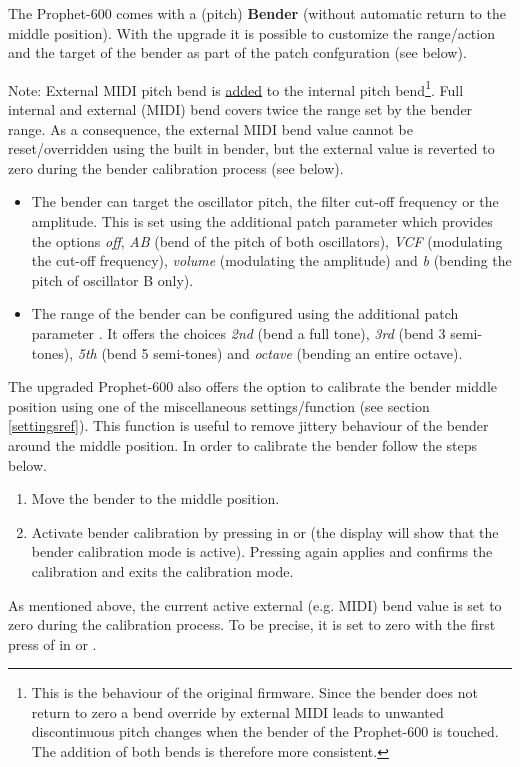 The Prophet-600 comes with a (pitch) \textbf{Bender} (without automatic return to the middle position). With the upgrade it is possible to customize the range/action and the target of the bender as part of the patch confguration (see below). 

Note: External MIDI pitch bend is \underline{added} to the internal pitch bend\footnote{This is the behaviour of the original firmware. Since the bender does not return to zero a bend override by external MIDI leads to unwanted discontinuous pitch changes when the bender of the Prophet-600 is touched. The addition of both bends is therefore more consistent.}. Full internal and external (MIDI) bend covers twice the range set by the bender range. As a consequence, the external MIDI bend value cannot be reset/overridden using the built in bender, but the external value is reverted to zero during the bender calibration process (see below).

\begin{itemize}
  \item The bender can target the oscillator pitch, the filter cut-off frequency or the amplitude. This is set using the additional patch parameter \bentarget which provides the options \textit{off}, \textit{AB} (bend of the pitch of both oscillators), \textit{VCF} (modulating the cut-off frequency), \textit{volume} (modulating the amplitude) and \textit{b} (bending the pitch of oscillator B only).
  \item The range of the bender can be configured using the additional patch parameter \bendrange. It offers the choices \textit{2nd} (bend a full tone), \textit{3rd} (bend 3 semi-tones), \textit{5th} (bend 5 semi-tones) and \textit{octave} (bending an entire octave).
\end{itemize}

The upgraded Prophet-600 also offers the option to calibrate the bender middle position using one of the miscellaneous settings/function (see section \ref{settingsref}). This function is useful to remove jittery behaviour of the bender around the middle position. In order to calibrate the bender follow the steps below.

\begin{enumerate}
  \item Move the bender to the middle position.  
  \item Activate bender calibration by pressing  in \shiftmode or \shiftlock (the display will show that the bender calibration mode is active). Pressing  again applies and confirms the calibration and exits the calibration mode.
\end{enumerate}

As mentioned above, the current active external (e.g. MIDI) bend value is set to zero during the calibration process. To be precise, it is set to zero with the first press of  in \shiftmode or \shiftlock.
